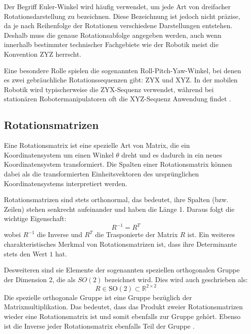 Der Begriff Euler-Winkel wird häufig verwendet, um jede Art von dreifacher Rotationsdarstellung zu bezeichnen.
Diese Bezeichnung ist jedoch nicht präzise, da je nach Reihenfolge der Rotationen verschiedene Darstellungen entstehen.
Deshalb muss die genaue Rotationsabfolge angegeben werden, auch wenn innerhalb bestimmter technischer Fachgebiete wie der Robotik meist die Konvention ZYZ herrscht.

Eine besondere Rolle spielen die sogenannten Roll-Pitch-Yaw-Winkel, bei denen es zwei gebräuchliche Rotationssequenzen gibt: ZYX und XYZ.
In der mobilen Robotik wird typischerweise die ZYX-Sequenz verwendet,
während bei stationären Robotermanipulatoren oft die XYZ-Sequenz Anwendung findet .

\subsection{Rotationsmatrizen}
Eine Rotationsmatrix ist eine spezielle Art von Matrix, die ein Koordinatensystem um einen Winkel $\theta$ dreht und es dadurch in ein neues Koordinatensystem transformiert.
Die Spalten einer Rotationsmatrix können dabei als die transformierten Einheitsvektoren des ursprünglichen Koordinatensystems interpretiert werden.

Rotationsmatrizen sind stets orthonormal, das bedeutet, ihre Spalten (bzw. Zeilen) stehen senkrecht aufeinander und haben die Länge 1.
Daraus folgt die wichtige Eigenschaft:
\[
 R^{-1}=R^T
 \]
wobei $R^{-1}$ die Inverse und $R^T$ die Trasponierte der Matrix $R$ ist.
Ein weiteres charakteristisches Merkmal von Rotationsmatrizen ist, dass ihre Determinante stets den Wert $1$ hat.

Desweiteren sind sie Elemente der sogenannten speziellen orthogonalen Gruppe der Dimension 2, die als $SO(2)$ bezeichnet wird. Dies wird auch geschrieben als:
\[
    R \in \mathrm{SO}(2) \subset \mathbb{R}^{2 \times 2}
\]
Die spezielle orthogonale Gruppe ist eine Gruppe bezüglich der Matrixmultiplikation.
Das bedeutet, dass das Produkt zweier Rotationsmatrizen wieder eine Rotationsmatrix ist und somit ebenfalls zur Gruppe gehört.
Ebenso ist die Inverse jeder Rotationsmatrix ebenfalls Teil der Gruppe .

